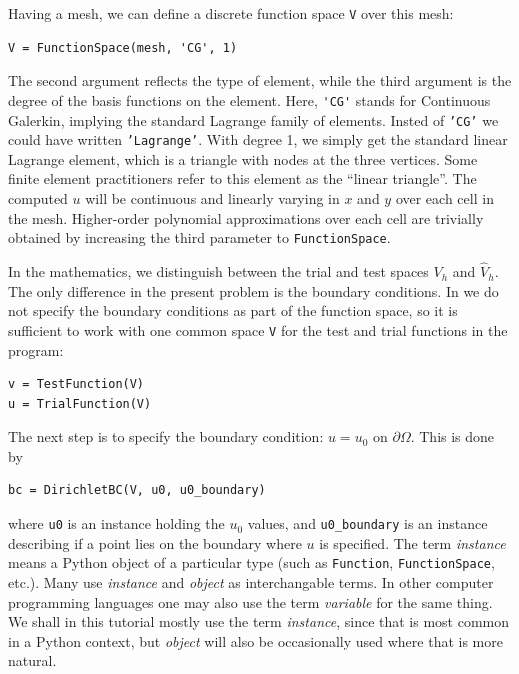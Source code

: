 Having a mesh, we can define a discrete function space {\fontsize{12pt}{12pt}\texttt{V}} over this mesh:
\begin{Verbatim}[fontsize=\fontsize{10pt}{10pt},tabsize=8,baselinestretch=1.05,
fontfamily=tt,xleftmargin=7mm]
V = FunctionSpace(mesh, 'CG', 1)
\end{Verbatim}
\noindent
The second argument reflects the type of element, while the third
argument is the degree of the basis functions on the element.
Here, {\fontsize{12pt}{12pt}\verb!'CG'!} stands
for Continuous Galerkin, implying the
standard Lagrange family of elements.
Insted of {\fontsize{12pt}{12pt}\texttt{'CG'}} we could have written {\fontsize{12pt}{12pt}\texttt{'Lagrange'}}.
With degree 1, we simply get the standard linear Lagrange element,
which is a triangle
with nodes at the three vertices.
Some finite element practitioners refer to this element as the
``linear triangle''.
The computed $u$ will be continuous and linearly varying in $x$ and $y$ over
each cell in the mesh.
Higher-order polynomial approximations over each cell are
trivially obtained by increasing the third parameter to
{\fontsize{12pt}{12pt}\texttt{FunctionSpace}}.

In the mathematics, we distinguish between the trial and test
spaces $V_h$ and $\hat{V}_h$. The only difference in the present problem
is the boundary conditions. In \fenics{} we do not specify the boundary
conditions as part of the function space, so it is sufficient to work
with one common space {\fontsize{12pt}{12pt}\verb!V!} for the test and trial functions in the
program:
\begin{Verbatim}[fontsize=\fontsize{10pt}{10pt},tabsize=8,baselinestretch=1.05,
fontfamily=tt,xleftmargin=7mm]
v = TestFunction(V)
u = TrialFunction(V)
\end{Verbatim}
\noindent

The next step is to specify the boundary condition: $u=u_0$ on
$\partial\Omega$. This is done by
\begin{Verbatim}[fontsize=\fontsize{10pt}{10pt},tabsize=8,baselinestretch=1.05,
fontfamily=tt,xleftmargin=7mm]
bc = DirichletBC(V, u0, u0_boundary)
\end{Verbatim}
\noindent
where {\fontsize{12pt}{12pt}\verb!u0!} is an instance holding the $u_0$ values,
and {\fontsize{12pt}{12pt}\verb!u0_boundary!} is an instance describing if a point lies
on the boundary where $u$ is specified. The term \emph{instance}
means a Python object of a particular type (such as {\fontsize{12pt}{12pt}\texttt{Function}},
{\fontsize{12pt}{12pt}\texttt{FunctionSpace}}, etc.).
Many use \emph{instance} and \emph{object}
as interchangable terms. In other computer programming languages one may
also use the term \emph{variable} for the same thing.
We shall in this tutorial mostly use the term \emph{instance},
since that is most common in a Python context, but \emph{object} will
also be occasionally used where that is more natural.

